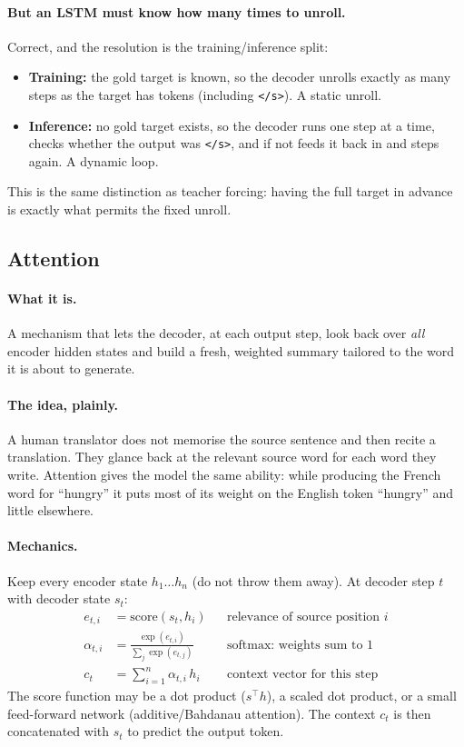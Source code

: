 \documentclass[11pt,a4paper]{article}
\begin{document}
\paragraph{But an LSTM must know how many times to unroll.} Correct, and the resolution is the
training/inference split:
\begin{itemize}
\item \textbf{Training:} the gold target is known, so the decoder unrolls exactly as many
  steps as the target has tokens (including \texttt{</s>}). A static unroll.
\item \textbf{Inference:} no gold target exists, so the decoder runs one step at a time,
  checks whether the output was \texttt{</s>}, and if not feeds it back in and steps again. A
  dynamic loop.
\end{itemize}
This is the same distinction as teacher forcing: having the full target in advance is exactly
what permits the fixed unroll.

\subsection{Attention}

\paragraph{What it is.} A mechanism that lets the decoder, at each output step, look back
over \emph{all} encoder hidden states and build a fresh, weighted summary tailored to the
word it is about to generate.

\paragraph{The idea, plainly.} A human translator does not memorise the source sentence and
then recite a translation. They glance back at the relevant source word for each word they
write. Attention gives the model the same ability: while producing the French word for
``hungry'' it puts most of its weight on the English token ``hungry'' and little elsewhere.

\paragraph{Mechanics.} Keep every encoder state $h_1 \ldots h_n$ (do not throw them away).
At decoder step $t$ with decoder state $s_{t}$:
\begin{align*}
e_{t,i} &= \mathrm{score}(s_{t}, h_i) && \text{relevance of source position } i \\
\alpha_{t,i} &= \frac{\exp(e_{t,i})}{\sum_j \exp(e_{t,j})} && \text{softmax: weights sum to 1} \\
c_t &= \sum_{i=1}^{n} \alpha_{t,i}\, h_i && \text{context vector for this step}
\end{align*}
The score function may be a dot product ($s^\top h$), a scaled dot product, or a small
feed-forward network (additive/Bahdanau attention). The context $c_t$ is then concatenated
with $s_t$ to predict the output token.
\end{document}
